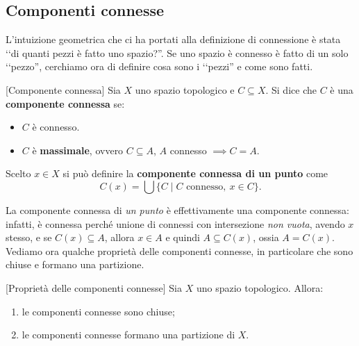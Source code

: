 \subsection{Componenti connesse}
L'intuizione geometrica che ci ha portati alla definizione di connessione è stata ‘‘di quanti pezzi è fatto uno spazio?''. Se uno spazio è connesso è fatto di un solo ‘‘pezzo'', cerchiamo ora di definire cosa sono i ‘‘pezzi'' e come sono fatti.
\begin{definition}{}[Componente connessa]
	Sia $X$ uno spazio topologico e $C\subseteq X$. Si dice che $C$ è una \textbf{componente connessa} se:
		\begin{itemize}
			\item $C$ è connesso.
			\item $C$ è \textbf{massimale}, ovvero $C\subseteq A$, $A$ connesso $\implies C=A$.
		\end{itemize}
	Scelto $x\in X$ si può definire la \textbf{componente connessa di un punto} come
	\begin{equation}
		\displaystyle C(x)=\bigcup \{C \mid C\text{ connesso},\ x\in C\}.
	\end{equation}
\end{definition}
La componente connessa di \textit{un punto} è effettivamente una componente connessa: infatti, è connessa perché unione di connessi con intersezione \textit{non vuota}, avendo $x$ stesso, e se $C(x)\subseteq A$, allora $x\in A$ e quindi $A\subseteq C(x)$, ossia $A=C(x)$.\\
Vediamo ora qualche proprietà delle componenti connesse, in particolare che sono chiuse e formano una partizione.
\begin{property}{}[Proprietà delle componenti connesse]
	Sia $X$ uno spazio topologico. Allora:
		\begin{enumerate}
			\item le componenti connesse sono chiuse;
			\item le componenti connesse formano una partizione di $X$.
		\end{enumerate}
\end{property}
